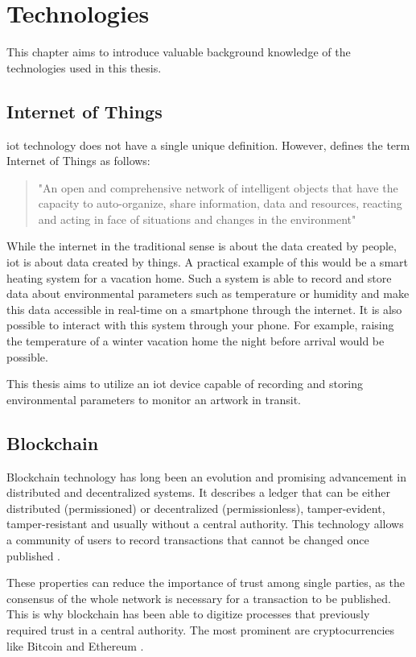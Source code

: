 \chapter{Technologies} %
\label{chap:technologies}
This chapter aims to introduce valuable background knowledge of the technologies used in this thesis.

\section{Internet of Things}
\gls{iot} technology does not have a single unique definition. However, \textcite{iot} defines the term Internet of Things as follows: %
\begin{quote}
    "An open and comprehensive network of intelligent objects that have the capacity to auto-organize, share information, data and resources, reacting and acting in face of situations and changes in the environment"
\end{quote}
While the internet in the traditional sense is about the data created by people, \gls{iot} is about data created by things. A practical example of this would be a smart heating system for a vacation home. Such a system is able to record and store data about environmental parameters such as temperature or humidity and make this data accessible in real-time on a smartphone through the internet. It is also possible to interact with this system through your phone. For example, raising the temperature of a winter vacation home the night before arrival would be possible.

This thesis aims to utilize an \gls{iot} device capable of recording and storing environmental parameters to monitor an artwork in transit.

\section{Blockchain}
Blockchain technology has long been an evolution and promising advancement in distributed and decentralized systems. It describes a ledger that can be either distributed (permissioned) or decentralized (permissionless), tamper-evident, tamper-resistant and usually without a central authority. This technology allows a community of users to record transactions that cannot be changed once published \parencite{blockchainoverview}.

These properties can reduce the importance of trust among single parties, as the consensus of the whole network is necessary for a transaction to be published. This is why blockchain has been able to digitize processes that previously required trust in a central authority. The most prominent are cryptocurrencies like Bitcoin and Ethereum \cite{bitcoin, ethereum}.

